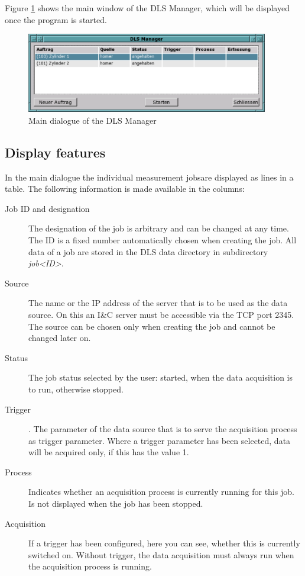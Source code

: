 \documentclass[a4paper,12pt,BCOR6mm,bibtotoc,idxtotoc]{scrbook}
\begin{document}
Figure \ref{fig:dls_ctl_main} shows the main window of the DLS Manager, which will be displayed once the program is started.

\begin{figure}[tbh] \begin{center} \includegraphics[width=300pt]{bilder/ctl_main} \end{center} \caption{Main dialogue of the DLS Manager} \label{fig:dls_ctl_main} \end{figure}


\subsection{Display features}

In the main dialogue the individual measurement jobsare displayed as lines in a table. The following information is made available in the columns:

\begin{description} 
\item[Job ID and designation] The designation of the job is arbitrary and can be changed at any time. The ID is a fixed number automatically chosen when creating the job. All data of a job are stored in the DLS data directory in subdirectory \textit{job\textless ID\textgreater}. 
\item[Source] The name or the IP address of the server that is to be
  used as the data source. On this an I\&C server must be accessible
  via the TCP port 2345. The source can be chosen only when creating
  the job and cannot be changed later on.
\item[Status] The job status selected by the user: \glqq started\grqq, when the data acquisition is to run, otherwise \glqq stopped\grqq. 
\item[Trigger]. The parameter of the data source that is to serve the acquisition process as trigger parameter. Where a trigger parameter has been selected, data will be acquired only, if this has the value 1. 
\item[Process] Indicates whether an acquisition process is currently running for this job. Is not displayed when the job has been stopped. 
\item[Acquisition] If a trigger has been configured, here you can see, whether this is currently switched on. Without trigger, the data acquisition must always run when the acquisition process is running. \end{description}
\end{document}
